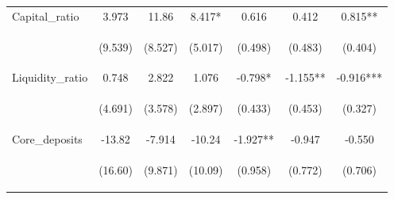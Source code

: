 \documentclass[]{article}
\begin{document}
\begin{center}
\begin{tabular}{lcccccc}
Capital\_ratio & 3.973 & 11.86 & 8.417* & 0.616 & 0.412 & 0.815** \\
\vspace{4pt} & \begin{footnotesize}(9.539)\end{footnotesize} & \begin{footnotesize}(8.527)\end{footnotesize} & \begin{footnotesize}(5.017)\end{footnotesize} & \begin{footnotesize}(0.498)\end{footnotesize} & \begin{footnotesize}(0.483)\end{footnotesize} & \begin{footnotesize}(0.404)\end{footnotesize} \\
Liquidity\_ratio & 0.748 & 2.822 & 1.076 & -0.798* & -1.155** & -0.916*** \\
\vspace{4pt} & \begin{footnotesize}(4.691)\end{footnotesize} & \begin{footnotesize}(3.578)\end{footnotesize} & \begin{footnotesize}(2.897)\end{footnotesize} & \begin{footnotesize}(0.433)\end{footnotesize} & \begin{footnotesize}(0.453)\end{footnotesize} & \begin{footnotesize}(0.327)\end{footnotesize} \\
Core\_deposits & -13.82 & -7.914 & -10.24 & -1.927** & -0.947 & -0.550 \\
\vspace{4pt} & \begin{footnotesize}(16.60)\end{footnotesize} & \begin{footnotesize}(9.871)\end{footnotesize} & \begin{footnotesize}(10.09)\end{footnotesize} & \begin{footnotesize}(0.958)\end{footnotesize} & \begin{footnotesize}(0.772)\end{footnotesize} & \begin{footnotesize}(0.706)\end{footnotesize} \\

\end{tabular}
\end{center}
\end{document}
